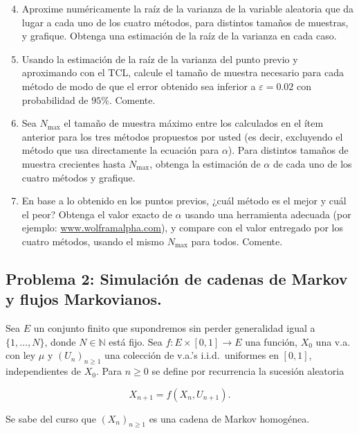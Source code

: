 \begin{enumerate} \setcounter{enumi}{3}
	
	\item Aproxime numéricamente la raíz de la varianza de la variable aleatoria que da lugar a cada uno de los cuatro métodos, para distintos tamaños de muestras, y grafique. Obtenga una estimación de la raíz de la varianza en cada caso.
	
	\item Usando la estimación de la raíz de la varianza del punto previo y aproximando con el TCL, calcule el tamaño de muestra necesario para cada método de modo de que el error obtenido sea inferior a $\varepsilon = 0.02$ con probabilidad de $95\%$. Comente.
	
	\item Sea $N_\text{max}$ el tamaño de muestra máximo entre los calculados en el ítem anterior para los tres métodos propuestos por usted (es decir, excluyendo el método que usa directamente la ecuación para $\alpha$). Para distintos tamaños de muestra crecientes hasta $N_\text{max}$, obtenga la estimación de $\alpha$ de cada uno de los cuatro métodos y grafique.
	
	\item En base a lo obtenido en los puntos previos, ¿cuál método es el mejor y cuál el peor? Obtenga el valor exacto de $\alpha$ usando una herramienta adecuada (por ejemplo: \url{www.wolframalpha.com}), y compare con el valor entregado por los cuatro métodos, usando el mismo $N_\text{max}$ para todos. Comente.
		
\end{enumerate}

\subsection*{Problema 2: Simulación de cadenas de Markov y flujos Markovianos. }

 Sea $E$ un conjunto finito que supondremos sin perder generalidad  igual a $ \{1,\ldots,N\}$, donde  $N\in\mathbb{N}$ está fijo. Sea $f:E\times [0,1]\rightarrow E$ una función, $X_{0}$ una v.a. con ley $\mu $ y $(U_{n})_{n\geq 1}$ una colección de v.a.'s i.i.d.\ uniformes en $[0,1]$, independientes de $X_{0}$.  Para $n\geq 0$ se define por recurrencia la sucesión aleatoria

 $$ X_{n+1}=f(X_n,U_{n+1}). $$

 Se sabe del curso  que $(X_n)_{n\geq 1}$ es una cadena de Markov homogénea.
	
